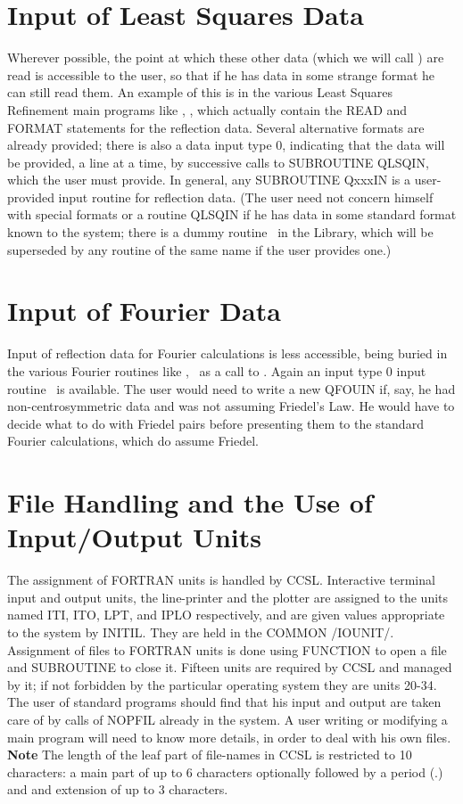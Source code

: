 \section{Input of Least Squares Data}
Wherever possible, the point at which these other data 
(which we will call ) are read is accessible to
the user, so that if he has data
in some strange format he can still read them. An example of this is
in the various Least Squares Refinement main programs like , 
,
which actually contain the READ and FORMAT statements for the reflection
data. Several alternative formats are already provided;  there is also a
data input type 0, indicating that the data will be provided, a line at a
time, by successive calls to SUBROUTINE QLSQIN, which the user must provide.\p
In general, any SUBROUTINE QxxxIN is a user-provided input routine for
reflection data.  (The user need not concern himself with special formats
or a routine QLSQIN if he has data in some standard format known to the
system; there is a dummy routine \ in the Library, which will be
superseded by any routine of the same name if the user provides one.)
%
\section{Input of Fourier Data}
Input of reflection data for Fourier calculations is less accessible,
being buried in the various Fourier routines like , 
\ as a
call to .  Again an input type 0 input routine \ is
available.  The user would need to write a new QFOUIN if, say, he had
non-centrosymmetric data and was not assuming Friedel's Law.  He would
have to decide what to do with Friedel pairs before presenting them to
the standard Fourier calculations, which do assume Friedel.
%
\section{File Handling and the Use of Input/Output Units}
The assignment of FORTRAN units is handled by CCSL.
Interactive terminal input and output units, the line-printer and the
plotter are assigned to the units named ITI, ITO, LPT, and IPLO
respectively, and are given values appropriate to the system by INITIL.
They are held in the COMMON /IOUNIT/.\p
Assignment of files to FORTRAN units is done using FUNCTION
 to open a file and SUBROUTINE  to close it.\p
Fifteen units are required by CCSL and managed by it; if not forbidden by
the particular operating system they are units 20-34.  The user of
standard programs should find that his input and output are taken care
of by calls of NOPFIL already in the system.  A user writing or
modifying a main program will need to know more details, in order to
deal with his own files.\p
{\bf Note} The length of the leaf part of file-names in CCSL is restricted
to 10 characters: a main part of up to 6 characters optionally followed by a period (.)
and and extension of up to 3 characters.
